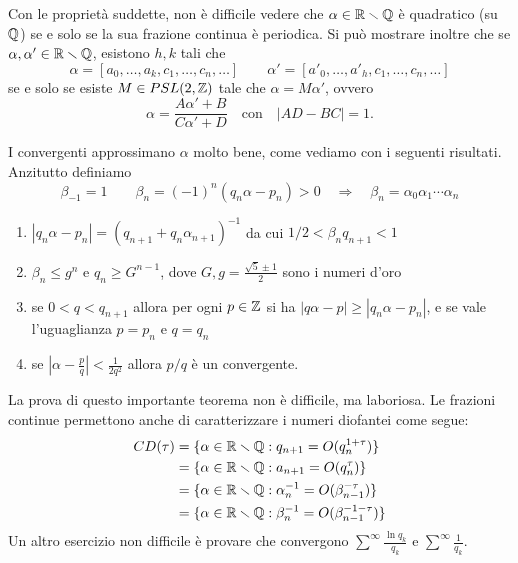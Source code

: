 \begin{esempio}
 Con le propriet\`a suddette, non \`e difficile vedere che $\alpha\in\irr$ \`e quadratico (su $\mathbb{Q}$) se e solo se la sua frazione continua  \`e periodica. 
 Si pu\`o mostrare inoltre che se $\alpha,\alpha'\in\mathbb{R}\smallsetminus\mathbb{Q}$, esistono $h,k$ tali che
 \[\alpha=[a_0,\dots,a_k,c_1,\dots,c_n,\dots] \qquad \alpha'=[a'_0,\dots,a'_h,c_1,\dots,c_n,\dots]\]
 se e solo se esiste $M\in PSL(2,\mathbb{Z})$ tale che $\alpha=M\alpha'$, ovvero 
 \[\alpha=\frac{A\alpha'+B}{C\alpha'+D}\quad \mbox{con}\quad |AD-BC|=1.\]
\end{esempio}

I convergenti approssimano $\alpha$ molto bene, come vediamo con i seguenti risultati. Anzitutto definiamo
\[\beta_{-1}=1\qquad \beta_n=(-1)^n(q_n\alpha-p_n)>0 \quad \Rightarrow \quad \beta_n=\alpha_0\alpha_1\cdots \alpha_n\]

\begin{teo}\label{miglioreappr}\begin{enumerate} Se $\alpha\in\irr$, valgono
  \item $|q_n\alpha-p_n|=(q_{n+1}+q_n\alpha_{n+1})^{-1}$ da cui $1/2<\beta_nq_{n+1}<1$
  \item $\beta_n\leq g^n$ e $q_n\geq G^{n-1}$, dove $G,g=\frac{\sqrt 5\pm 1}{2}$ sono i numeri d'oro
  \item se $0<q<q_{n+1}$ allora per ogni $p\in\mathbb{Z}$ si ha $|q\alpha-p|\geq |q_n\alpha-p_n|$, e se vale l'uguaglianza $p=p_n$ e $q=q_n$
  \item se $\left|\alpha-\frac{p}{q}\right|<\frac{1}{2q^2}$ allora $p/q$  \`e un convergente.
  \end{enumerate}\end{teo}

La prova di questo importante teorema non  \`e difficile, ma laboriosa. Le frazioni continue permettono anche di caratterizzare i numeri diofantei come segue:
\[\begin{split} CD(\tau)&=\{\alpha\in\mathbb{R}\smallsetminus\mathbb{Q}:q_{n+1}=O(q_n^{1+\tau})\}\\
			&=\{\alpha\in\mathbb{R}\smallsetminus\mathbb{Q}:a_{n+1}=O(q_n^{\tau})\}\\
			&=\{\alpha\in\mathbb{R}\smallsetminus\mathbb{Q}:\alpha_n^{-1}=O(\beta_{n-1}^{-\tau})\}\\
			&=\{\alpha\in\mathbb{R}\smallsetminus\mathbb{Q}:\beta_n^{-1}=O(\beta_{n-1}^{-1-\tau})\}
\end{split}\]
Un altro esercizio non difficile  \`e provare che convergono $\sum^\infty\frac{\ln q_k}{q_k}$ e $\sum^\infty\frac{1}{q_k}$.



